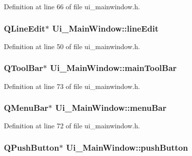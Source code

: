Definition at line 66 of file ui\-\_\-mainwindow.\-h.

\hypertarget{class_ui___main_window_a7a5b9a4633d64f502ce81da3202d828c}{
\subsubsection[{line\-Edit}]{\setlength{\rightskip}{0pt plus 5cm}Q\-Line\-Edit$\ast$ Ui\-\_\-\-Main\-Window\-::line\-Edit}}\label{class_ui___main_window_a7a5b9a4633d64f502ce81da3202d828c}


Definition at line 50 of file ui\-\_\-mainwindow.\-h.

\hypertarget{class_ui___main_window_a5172877001c8c7b4e0f6de50421867d1}{
\subsubsection[{main\-Tool\-Bar}]{\setlength{\rightskip}{0pt plus 5cm}Q\-Tool\-Bar$\ast$ Ui\-\_\-\-Main\-Window\-::main\-Tool\-Bar}}\label{class_ui___main_window_a5172877001c8c7b4e0f6de50421867d1}


Definition at line 73 of file ui\-\_\-mainwindow.\-h.

\hypertarget{class_ui___main_window_a2be1c24ec9adfca18e1dcc951931457f}{
\subsubsection[{menu\-Bar}]{\setlength{\rightskip}{0pt plus 5cm}Q\-Menu\-Bar$\ast$ Ui\-\_\-\-Main\-Window\-::menu\-Bar}}\label{class_ui___main_window_a2be1c24ec9adfca18e1dcc951931457f}


Definition at line 72 of file ui\-\_\-mainwindow.\-h.

\hypertarget{class_ui___main_window_ad332d93084584930878f1daf5f84cdbf}{
\subsubsection[{push\-Button}]{\setlength{\rightskip}{0pt plus 5cm}Q\-Push\-Button$\ast$ Ui\-\_\-\-Main\-Window\-::push\-Button}}\label{class_ui___main_window_ad332d93084584930878f1daf5f84cdbf}


